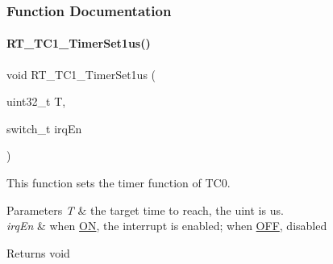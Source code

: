 \subsubsection{Function Documentation}
\mbox{\label{a00044_a88f5b0594e9e1006860ebde0dc13c148}} 
\paragraph{\texorpdfstring{R\+T\+\_\+\+T\+C1\+\_\+\+Timer\+Set1us()}{RT\_TC1\_TimerSet1us()}}
{\footnotesize\ttfamily void R\+T\+\_\+\+T\+C1\+\_\+\+Timer\+Set1us (\begin{DoxyParamCaption}\item[{uint32\+\_\+t}]{T,  }\item[{switch\+\_\+t}]{irq\+En }\end{DoxyParamCaption})}



This function sets the timer function of T\+C0. 


\begin{DoxyParams}{Parameters}
{\em T} & the target time to reach, the uint is us. \\
\hline
{\em irq\+En} & when \mbox{\hyperlink{a00020_ad76d1750a6cdeebd506bfcd6752554d2}{ON}}, the interrupt is enabled; when \mbox{\hyperlink{a00020_a29e413f6725b2ba32d165ffaa35b01e5}{O\+FF}}, disabled \\
\hline
\end{DoxyParams}
\begin{DoxyReturn}{Returns}
void 
\end{DoxyReturn}

